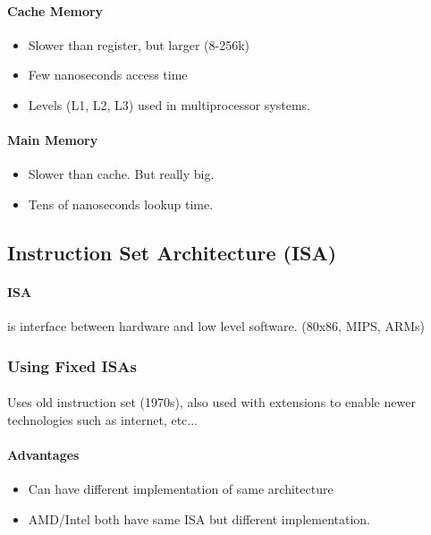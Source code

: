 \documentclass{article}
\newcommand\tab[1][0.5cm]{\hspace*{#1}}
\begin{document}
		\paragraph{\tab Cache Memory}
		\begin{itemize}
			\item Slower than register, but larger (8-256k)
			\item Few nanoseconds access time
			\item Levels (L1, L2, L3) used in multiprocessor systems.
		\end{itemize}

		\paragraph{\tab Main Memory}
		\begin{itemize}
			\item Slower than cache. But really big.
			\item Tens of nanoseconds lookup time.
		\end{itemize}

	\subsection*{Instruction Set Architecture (ISA)}
		\paragraph{\tab ISA} is interface between hardware and low level software. (80x86, MIPS, ARMs)

		\subsubsection*{Using Fixed ISAs}
			\paragraph{} Uses old instruction set (1970s), also used with extensions to enable newer technologies such as internet, etc...

			\paragraph{\tab Advantages}
			\begin{itemize}
				\item Can have different implementation of same architecture
				\item AMD/Intel both have same ISA but different implementation.
			\end{itemize}
\end{document}
